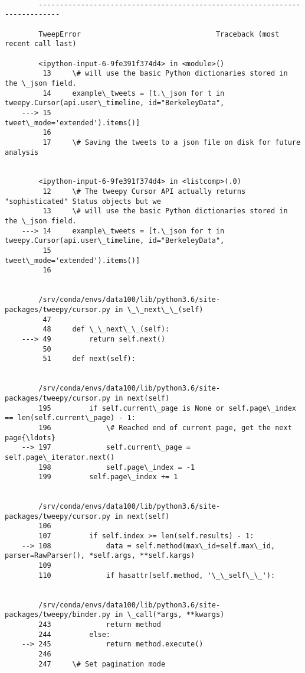 \documentclass[11pt]{article}
\begin{document}
    \begin{Verbatim}[commandchars=\\\{\}]

        ---------------------------------------------------------------------------

        TweepError                                Traceback (most recent call last)

        <ipython-input-6-9fe391f374d4> in <module>()
         13     \# will use the basic Python dictionaries stored in the \_json field.
         14     example\_tweets = [t.\_json for t in tweepy.Cursor(api.user\_timeline, id="BerkeleyData", 
    ---> 15                                              tweet\_mode='extended').items()]
         16 
         17     \# Saving the tweets to a json file on disk for future analysis


        <ipython-input-6-9fe391f374d4> in <listcomp>(.0)
         12     \# The tweepy Cursor API actually returns "sophisticated" Status objects but we
         13     \# will use the basic Python dictionaries stored in the \_json field.
    ---> 14     example\_tweets = [t.\_json for t in tweepy.Cursor(api.user\_timeline, id="BerkeleyData", 
         15                                              tweet\_mode='extended').items()]
         16 


        /srv/conda/envs/data100/lib/python3.6/site-packages/tweepy/cursor.py in \_\_next\_\_(self)
         47 
         48     def \_\_next\_\_(self):
    ---> 49         return self.next()
         50 
         51     def next(self):


        /srv/conda/envs/data100/lib/python3.6/site-packages/tweepy/cursor.py in next(self)
        195         if self.current\_page is None or self.page\_index == len(self.current\_page) - 1:
        196             \# Reached end of current page, get the next page{\ldots}
    --> 197             self.current\_page = self.page\_iterator.next()
        198             self.page\_index = -1
        199         self.page\_index += 1


        /srv/conda/envs/data100/lib/python3.6/site-packages/tweepy/cursor.py in next(self)
        106 
        107         if self.index >= len(self.results) - 1:
    --> 108             data = self.method(max\_id=self.max\_id, parser=RawParser(), *self.args, **self.kargs)
        109 
        110             if hasattr(self.method, '\_\_self\_\_'):


        /srv/conda/envs/data100/lib/python3.6/site-packages/tweepy/binder.py in \_call(*args, **kwargs)
        243             return method
        244         else:
    --> 245             return method.execute()
        246 
        247     \# Set pagination mode



\end{Verbatim}
\end{document}
